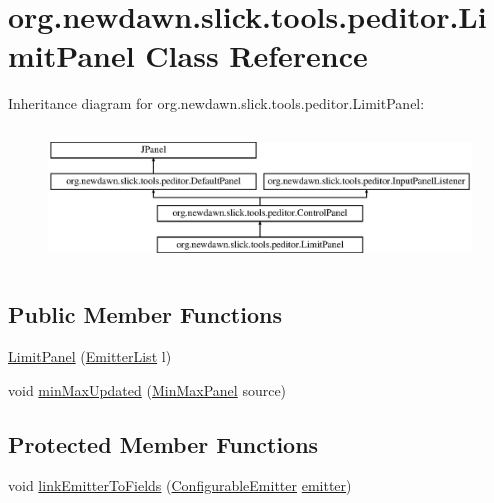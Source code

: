 \hypertarget{classorg_1_1newdawn_1_1slick_1_1tools_1_1peditor_1_1_limit_panel}{}\section{org.\+newdawn.\+slick.\+tools.\+peditor.\+Limit\+Panel Class Reference}
\label{classorg_1_1newdawn_1_1slick_1_1tools_1_1peditor_1_1_limit_panel}
Inheritance diagram for org.\+newdawn.\+slick.\+tools.\+peditor.\+Limit\+Panel\+:\begin{figure}[H]
\begin{center}
\leavevmode
\includegraphics[height=3.660131cm]{classorg_1_1newdawn_1_1slick_1_1tools_1_1peditor_1_1_limit_panel}
\end{center}
\end{figure}
\subsection*{Public Member Functions}
\begin{DoxyCompactItemize}
\item 
\mbox{\hyperlink{classorg_1_1newdawn_1_1slick_1_1tools_1_1peditor_1_1_limit_panel_afc404d364477e64bf7b3165dd325962d}{Limit\+Panel}} (\mbox{\hyperlink{classorg_1_1newdawn_1_1slick_1_1tools_1_1peditor_1_1_emitter_list}{Emitter\+List}} l)
\item 
void \mbox{\hyperlink{classorg_1_1newdawn_1_1slick_1_1tools_1_1peditor_1_1_limit_panel_a2e80ba4676be1b1e01aaec91f0e190b2}{min\+Max\+Updated}} (\mbox{\hyperlink{classorg_1_1newdawn_1_1slick_1_1tools_1_1peditor_1_1_min_max_panel}{Min\+Max\+Panel}} source)
\end{DoxyCompactItemize}
\subsection*{Protected Member Functions}
\begin{DoxyCompactItemize}
\item 
void \mbox{\hyperlink{classorg_1_1newdawn_1_1slick_1_1tools_1_1peditor_1_1_limit_panel_a193a0ea6307de7fe4d2b9f04920e52e5}{link\+Emitter\+To\+Fields}} (\mbox{\hyperlink{classorg_1_1newdawn_1_1slick_1_1particles_1_1_configurable_emitter}{Configurable\+Emitter}} \mbox{\hyperlink{classorg_1_1newdawn_1_1slick_1_1tools_1_1peditor_1_1_control_panel_aaa170169fa574cb6b271f782afcd2517}{emitter}})
\end{DoxyCompactItemize}
